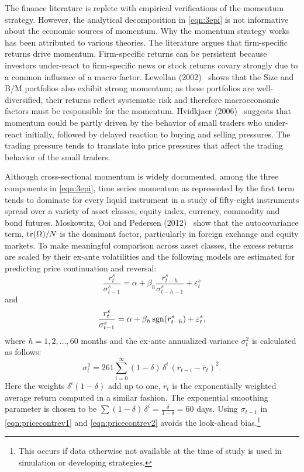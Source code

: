 The finance literature is replete with empirical verifications of the momentum strategy. However, the analytical decomposition in \eqref{eqn:3epi} is not informative about the economic sources of momentum. Why the momentum strategy works has been attributed to various theories. The literature argues that firm-specific returns drive momentum. Firm-specific returns can be persistent because investors under-react to firm-specific news or stock returns covary strongly due to a common influence of a macro factor. Lewellan (2002)~\cite{lew2002} shows that the Size and B/M portfolios also exhibit strong momentum; as these portfolios are well-diversified, their returns reflect systematic risk and therefore macroeconomic factors must be responsible for the momentum. Hvidkjaer (2006)~\cite{hvid2006} suggests that momentum could be partly driven by the behavior of small traders who under-react initially, followed by delayed reaction to buying and selling pressures. The trading pressure tends to translate into price pressures that affect the trading behavior of the small traders.


Although cross-sectional momentum is widely documented, among the three components in \eqref{eqn:3epi}, time series momentum as represented by the first term tends to dominate for every liquid instrument in a study of fifty-eight instruments spread over a variety of asset classes, equity index, currency, commodity and bond futures. Moskowitz, Ooi and Pedersen (2012)~\cite{mos2012} show that the autocovariance term, $\operatorname{tr}(\Omega)/N$ is the dominant factor, particularly in foreign exchange and equity markets. To make meaningful comparison across asset classes, the excess returns are scaled by their ex-ante volatilities and the following models are estimated for predicting price continuation and reversal:
	\begin{equation} \label{eqn:pricecontrev1}
	\frac{r_t^s}{\sigma_{t-1}^s} = \alpha + \beta_h \dfrac{r_{t-h}^s}{\sigma_{t-h-1}^s} + \varepsilon_t^s
	\end{equation}
and
	\begin{equation} \label{eqn:pricecontrev2}
	\frac{r_t^s}{\sigma_{t-1}^s} = \alpha + \beta_h \sgn(r_{t-h}^s) + \varepsilon_t^s,
	\end{equation}
where $h= 1,2, \ldots, 60$ months and the ex-ante annualized variance $\sigma_t^2$ is calculated as follows:
	\begin{equation} \label{eqn:pricecontrev3}
	\sigma_t^2 = 261 \sum_{i=0}^\infty (1 - \delta)\,\delta^i \,(r_{t-i} - \overline{r}_t)^2.
	\end{equation}
Here the weights $\delta^i (1 - \delta)$ add up to one, $\overline{r}_t$ is the exponentially weighted average return computed in a similar fashion. The exponential smoothing parameter is chosen to be $\sum(1 - \delta)\, \delta^i = \frac{\delta}{1 - \delta} = 60$ days. Using $\sigma_{t-1}$ in \eqref{eqn:pricecontrev1} and \eqref{eqn:pricecontrev2} avoids the look-ahead bias.\footnote{This occurs if data otherwise not available at the time of study is used in simulation or developing strategies.}


